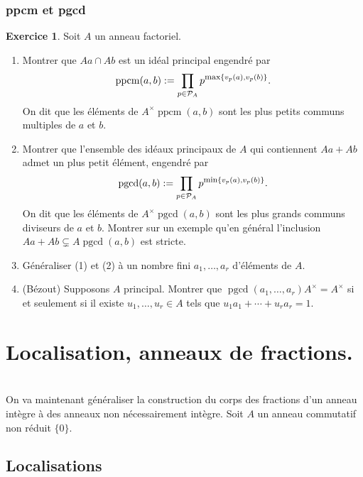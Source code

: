 \documentclass[a4paper, oneside, 12pt]{book}
\theoremstyle{definition} %
\newtheorem{exercice}[theoreme]{Exercice}
\DeclareMathOperator{\pgcd}{pgcd}
\DeclareMathOperator{\ppcm}{ppcm}
\begin{document}
\subsection{ppcm et pgcd}
\begin{exercice}
  Soit $A$ un anneau factoriel. 
  \begin{enumerate}
  \item Montrer que $Aa\cap Ab$ est un idéal principal engendré par 
    $$\ppcm(a, b):=\prod_{p\in\mathcal{P}_A}p^{\hbox{\rm \footnotesize max}\{v_p(a),v_p(b)\}}.$$
    On dit que les éléments de $A^\times \ppcm(a, b) $ sont les plus petits communs multiples de $a$ et $b$.
  \item Montrer que l'ensemble des idéaux principaux de $A$ qui contiennent $Aa+ Ab$ admet un plus petit élément, engendré par
    $$\pgcd(a, b):=\prod_{p\in\mathcal{P}_A}p^{\hbox{\rm \footnotesize min}\{ v_p(a),v_p(b)\}}.$$
    On dit que les éléments de $A^\times \pgcd(a, b) $ sont les plus grands communs diviseurs de $a$ et $b$. Montrer sur un exemple qu'en général l'inclusion $Aa+Ab\subsetneq A\pgcd(a,b)$ est stricte.
  \item Généraliser  (1) et (2) à un nombre fini $a_1,\dotsc, a_r$ d'éléments de $A$.
  \item (Bézout) Supposons $A$ principal. Montrer que $\pgcd(a_1,\dotsc, a_r)A^\times= A^\times$ si et seulement si il existe $u_1,\dotsc, u_r\in A$ tels que $u_1a_1+\dotsb+u_ra_r=1$.
  \end{enumerate}
\end{exercice}


 

 
\chapter{Localisation, anneaux de fractions.}\textit{}\\
 On va maintenant généraliser la construction du corps des fractions d'un anneau intègre à des anneaux non nécessairement intègre. Soit $A$ un anneau commutatif non réduit $\{0\}$. 

\section{Localisations}
\end{document}
